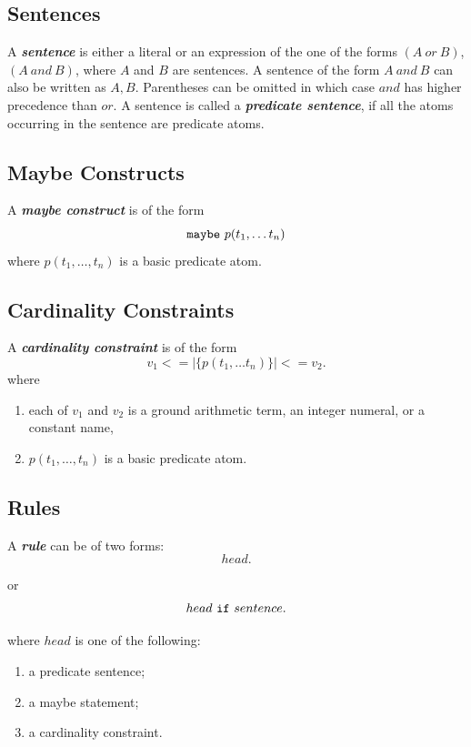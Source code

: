 \documentclass[a4paper,10pt]{article}
\begin{document}
\subsection{Sentences}\label{sentsec}

A \textit{\textbf{sentence}} is either a literal or an expression of the one of the forms  $(A~or~B)$, $(A~and~B)$, where $A$ and $B$ are sentences. A sentence of the form $A~and~B$
can also be written as $A, B$. Parentheses can be omitted in which case $and$ has higher precedence than $or$. A sentence is called a \textbf{\textit{predicate sentence}}, if all the atoms occurring in the sentence are predicate atoms.

\subsection{Maybe Constructs}

A \textbf{\textit{maybe construct}} is of the form $$\mbox{\texttt{maybe}}~p(t_1,\ldots t_n)$$ where $p(t_1,\ldots,t_n)$ is a basic predicate atom.

\subsection{Cardinality Constraints}

A \textit{\textbf{cardinality constraint}} is of the form 
$$v_1 <= |\{p(t_1,\ldots t_n)\}| <= v_2.$$
where
\begin{enumerate}
\item each of $v_1$ and $v_2$ is a ground arithmetic term, an integer numeral, or a constant name, 
\item $p(t_1,\ldots,t_n)$ is a basic predicate atom.
\end{enumerate}
\subsection{Rules} \label{rl}

A \textit{\textbf{rule}} can be of two forms:
\begin{equation}\label{eq1}
  head. 
\end{equation}

\noindent
or 
\begin{equation}
head~\mbox{\texttt{if}}~sentence.
\end{equation}

\noindent
where $head$ is one of the following:
\begin{enumerate}
\item  a predicate sentence;
\item  a maybe statement;
\item  a cardinality constraint.
\end{enumerate}
\end{document}
